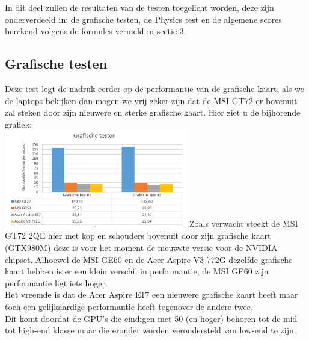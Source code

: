 In dit deel zullen de resultaten van de testen toegelicht worden, deze zijn onderverdeeld in: de grafische testen, de Physics test en de algemene scores berekend volgens de formules vermeld in sectie 3.

\subsection{Grafische testen}

Deze test legt de nadruk eerder op de performantie van de grafische kaart, als we de laptops bekijken dan mogen we vrij zeker zijn dat de MSI GT72 er bovenuit zal steken door zijn nieuwere en sterke grafische kaart. Hier ziet u de bijhorende grafiek: \\
\includegraphics[width=8cm]{grafische}
\vskip 0.1cm
\noindent
Zoals verwacht steekt de MSI GT72 2QE hier met kop en schouders bovenuit door zijn grafische kaart (GTX980M) deze is voor het moment de nieuwste versie voor de NVIDIA chipset.
Alhoewel de MSI GE60 en de Acer Aspire V3 772G dezelfde grafische kaart hebben is er een klein verschil in performantie, de MSI GE60 zijn performantie ligt iets hoger.\\
Het vreemde is dat de Acer Aspire E17 een nieuwere grafische kaart heeft maar toch een gelijkaardige performantie heeft tegenover de andere twee.\\ Dit komt doordat de GPU's die eindigen met 50 (en hoger) behoren tot de mid- tot high-end klasse maar die eronder worden verondersteld van low-end te zijn.

